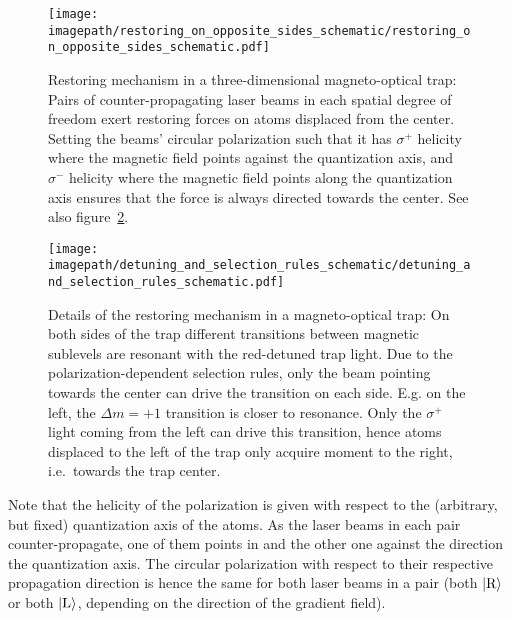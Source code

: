 \begin{figure}
    \centering
    \texttt{[image: \\imagepath/restoring\_on\_opposite\_sides\_schematic/restoring\_on\_opposite\_sides\_schematic.pdf]}
    \caption{Restoring mechanism in a three-dimensional magneto-optical trap: Pairs of counter-propagating laser beams in each spatial degree of freedom exert restoring forces on atoms displaced from the center. Setting the beams' circular polarization such that it has $\sigma^+$ helicity where the magnetic field points against the quantization axis, and $\sigma^-$ helicity where the magnetic field points along the quantization axis ensures that the force is always directed towards the center. See also figure~\ref{fig:detuning_and_selection_rules_schematic}.}
    \label{fig:restoring_on_opposite_sides_schematic}
\end{figure} 

\begin{figure}
    \centering
    \texttt{[image: \\imagepath/detuning\_and\_selection\_rules\_schematic/detuning\_and\_selection\_rules\_schematic.pdf]}
    \caption{Details of the restoring mechanism in a magneto-optical trap: On both sides of the trap different transitions between magnetic sublevels are resonant with the red-detuned trap light. Due to the polarization-dependent selection rules, only the  beam pointing towards the center can drive the transition on each side. E.g. on the left, the $\Delta  m = +1$ transition is closer to resonance. Only the $\sigma^+$ light coming from the left can drive this transition, hence atoms displaced to the left of the trap only acquire moment to the right, i.e.~towards the trap center.}
    \label{fig:detuning_and_selection_rules_schematic}
\end{figure}

Note that the helicity of the polarization is given with respect to the (arbitrary, but fixed) quantization axis of the atoms. As the laser beams in each pair counter-propagate, one of them points in and the other one against the direction the quantization axis. The circular polarization with respect to their respective propagation direction is hence the same for both laser beams in a pair (both $\Ket{\text{R}}$ or both $\Ket{\text{L}}$, depending on the direction of the gradient field).


